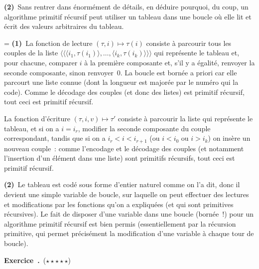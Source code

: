 \documentclass[12pt,a4paper]{article}
\theoremstyle{definition}
\newcommand\exercice{%
\refstepcounter{comcnt}\bigskip\noindent\textbf{Exercice~\thecomcnt.}}
\newcommand{\dbllangle}{\mathopen{\langle\!\langle}}
\newcommand{\dblrangle}{\mathclose{\rangle\!\rangle}}
\newif\ifcorrige
\newenvironment{corrige}%
{\ifcorrige\relax\else\setbox0=\vbox\bgroup\fi%
\smallbreak\footnotesize\noindent{\underbar{\textit{Corrigé.}}\quad}}
{{\hbox{}\nobreak\hfill\checkmark}%
\ifcorrige\relax\else\egroup\fi\par}
\begin{document}
\textbf{(2)} Sans rentrer dans énormément de détails, en déduire
pourquoi, du coup, un algorithme primitif récursif peut utiliser un
tableau dans une boucle où elle lit et écrit des valeurs arbitraires
du tableau.

\begin{corrige}
\textbf{(1)} La fonction de lecture $(\tau,i) \mapsto \tau(i)$
consiste à parcourir tous les couples de la liste $\dbllangle \langle
i_1,\tau(i_1)\rangle, \ldots, \langle i_k,\tau(i_k)\rangle \dblrangle$
qui représente le tableau et, pour chacune, comparer $i$ à la première
composante et, s'il y a égalité, renvoyer la seconde composante, sinon
renvoyer $0$.  La boucle est bornée a priori car elle parcourt une
liste connue (dont la longueur est majorée par le numéro qui la code).
Comme le décodage des couples (et donc des listes) est primitif
récursif, tout ceci est primitif récursif.

La fonction d'écriture $(\tau,i,v) \mapsto \tau'$ consiste à parcourir
la liste qui représente le tableau, et si on a $i = i_r$, modifier la
seconde composante du couple correspondant, tandis que si on a $i_r <
i < i_{r+1}$ (ou $i < i_0$ ou $i > i_k$) on insère un nouveau couple :
comme l'encodage et le décodage des couples (et notamment l'insertion
d'un élément dans une liste) sont primitifs récursifs, tout ceci est
primitif récursif.

\textbf{(2)} Le tableau est codé sous forme d'entier naturel comme on
l'a dit, donc il devient une simple variable de boucle, sur laquelle
on peut effectuer des lectures et modifications par les fonctions
qu'on a expliquées (et qui sont primitives récursives).  Le fait de
disposer d'une variable dans une boucle (bornée !) pour un algorithme
primitif récursif est bien permis (essentiellement par la récursion
primitive, qui permet précisément la modification d'une variable à
chaque tour de boucle).
\end{corrige}

%

\exercice\label{exercise-ackermann-indicator-is-p-r}\ (${\star}{\star}{\star}{\star}{\star}$)\par\nobreak
\end{document}
